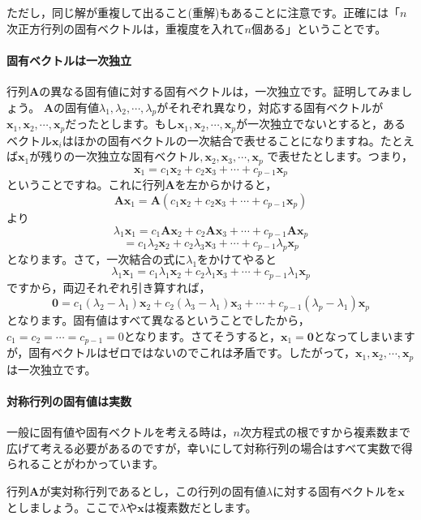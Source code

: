 \documentclass{ltjsbook}
\begin{document}
ただし，同じ解が重複して出ること(重解)もあることに注意です。正確には「$n$次正方行列の固有ベクトルは，重複度を入れて$n$個ある」ということです。

\paragraph{固有ベクトルは一次独立}

行列$\bm{A}$の異なる固有値に対する固有ベクトルは，一次独立です。証明してみましょう。
$\bm{A}$の固有値$\lambda_1,\lambda_2,\cdots,\lambda_p$がそれぞれ異なり，対応する固有ベクトルが$\bm{x}_1,\bm{x}_2,\cdots,\bm{x}_p$だったとします。もし$\bm{x}_1,\bm{x}_2,\cdots,\bm{x}_p$が一次独立でないとすると，あるベクトル$\bm{x}_i$はほかの固有ベクトルの一次結合で表せることになりますね。たとえば$\bm{x}_1$が残りの一次独立な固有ベクトル$,\bm{x}_{2},\bm{x}_{3},\cdots,\bm{x}_{p}$ で表せたとします。つまり，
\[ \bm{x}_1 = c_1\bm{x}_{2} + c_2\bm{x}_{3} + \cdots + c_{p-1}\bm{x}_{p} \]
ということですね。これに行列$\bm{A}$を左からかけると，
\[ \bm{A}\bm{x}_1 = \bm{A}(c_1\bm{x}_{2} + c_2\bm{x}_{3} + \cdots + c_{p-1}\bm{x}_{p}) \]
より
\[ \lambda_1\bm{x}_1= c_1\bm{A}\bm{x}_{2} + c_2\bm{A}\bm{x}_{3} + \cdots + c_{p-1}\bm{A}\bm{x}_{p} \]
\[ = c_1\lambda_{2}\bm{x}_{2} + c_2\lambda_{3}\bm{x}_{3} + \cdots + c_{p-1}\lambda_{p}\bm{x}_{p} \]
となります。さて，一次結合の式に$\lambda_1$をかけてやると
\[ \lambda_1\bm{x}_1 = c_1\lambda_1\bm{x}_{2} + c_2\lambda_1\bm{x}_{3} + \cdots + c_{p-1}\lambda_1\bm{x}_{p} \]
ですから，両辺それぞれ引き算すれば，
\[ \bm{0} = c_1(\lambda_{2}-\lambda_1)\bm{x}_{2} + c_2(\lambda_{3}-\lambda_1)\bm{x}_{3} + \cdots +c_{p-1}(\lambda_{p}-\lambda_1)\bm{x}_{p} \]
となります。固有値はすべて異なるということでしたから，$c_1=c_2=\cdots=c_{p-1}=0$となります。さてそうすると，$\bm{x}_1=\bm{0}$となってしまいますが，固有ベクトルはゼロではないのでこれは矛盾です。したがって，$\bm{x}_1,\bm{x}_2,\cdots,\bm{x}_p$は一次独立です。

\paragraph{対称行列の固有値は実数}
一般に固有値や固有ベクトルを考える時は，$n$次方程式の根ですから複素数まで広げて考える必要があるのですが，幸いにして対称行列の場合はすべて実数で得られることがわかっています。

行列$\bm{A}$が実対称行列であるとし，この行列の固有値$\lambda$に対する固有ベクトルを$\bm{x}$としましょう。ここで$\lambda$や$\bm{x}$は複素数だとします。
\end{document}
